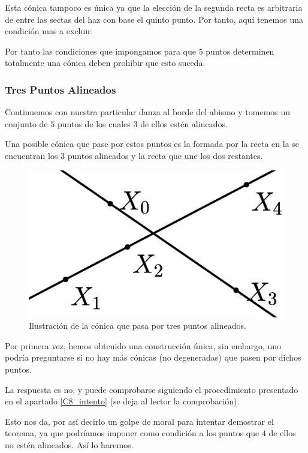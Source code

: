 	Esta cónica tampoco es única ya que la elección de la segunda recta es arbitraria de entre las sectas del haz con base el quinto punto. Por tanto, aquí tenemos una condición mas a excluir.
	
	Por tanto las condiciones que impongamos para que $5$ puntos determinen totalmente una cónica deben prohibir que esto suceda.
	
\subsubsection{Tres Puntos Alineados}
	Continuemos con nuestra particular danza al borde del abismo y tomemos un conjunto de $5$ puntos de los cuales $3$ de ellos estén alineados.
	
	Una posible cónica que pase por estos puntos es la formada por la recta en la se encuentran los $3$ puntos alineados y la recta que une los dos restantes.
	
	\begin{figure}[h]
		\centering
		\includegraphics[scale=.15]{Graficos/alineados3.eps}
		\caption{Ilustración de la cónica que pasa por tres puntos alineados.}
		\label{C8_img_alineados3}
	\end{figure}
	
	Por primera vez, hemos obtenido una construcción única, sin embargo, uno podría preguntarse si no hay más cónicas (no degeneradas) que pasen por dichos puntos.
	
	La respuesta es no, y puede comprobarse siguiendo el procedimiento presentado en el apartado \ref{C8_intento} (se deja al lector la comprobación).
	
	Esto nos da, por así decirlo un golpe de moral para intentar demostrar el teorema, ya que podríamos imponer como condición a los puntos que $4$ de ellos no estén alineados. Así lo haremos.
